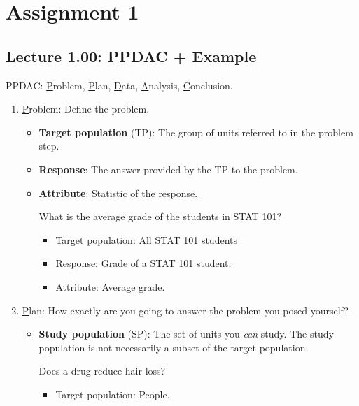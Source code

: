 \chapter{Assignment 1}
\section{Lecture 1.00: PPDAC + Example}
PPDAC\@: \underline{P}roblem, \underline{P}lan, \underline{D}ata,
\underline{A}nalysis, \underline{C}onclusion.
\begin{enumerate}
    \item \underline{P}roblem: Define the problem.
          \begin{itemize}
              \item \textbf{Target population} (TP): The group of units referred to in the problem step.
              \item \textbf{Response}: The answer provided by the TP to the problem.
              \item \textbf{Attribute}: Statistic of the response.
                    \begin{Example}{}{}
                        What is the average grade of the students in STAT 101?
                        \begin{itemize}
                            \item Target population: All STAT 101 students
                            \item Response: Grade of a STAT 101 student.
                            \item Attribute: Average grade.
                        \end{itemize}
                    \end{Example}
          \end{itemize}
    \item \underline{P}lan: How exactly are you going to answer the problem you posed yourself?
          \begin{itemize}
              \item \textbf{Study population} (SP): The set of units you \emph{can} study.
                    The study population is not necessarily a subset of the target population.
                    \begin{Example}{}{}
                        Does a drug reduce hair loss?
                        \begin{itemize}
                            \item Target population: People.

\end{itemize}
\end{Example}
\end{itemize}
\end{enumerate}
